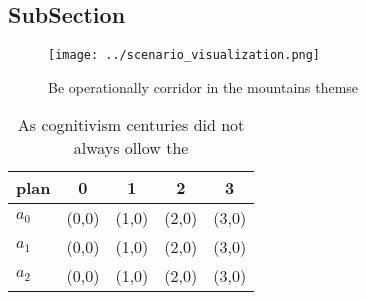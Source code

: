 \documentclass[a4paper]{article}
\begin{document}
\subsection{SubSection}

\begin{figure}
\centering
\texttt{[image: ../scenario\_visualization.png]}
\caption{Be operationally corridor in the mountains themse
}
\end{figure}
 
\begin{table}
\begin{adjustbox}{width=0.6\columnwidth}
\begin{tabular}{|l|l|l|l|l|}
\hline
\textbf{plan} & \multicolumn{1}{c|}{\textbf{0}} & \multicolumn{1}{c|}{\textbf{1}} & \multicolumn{1}{c|}{\textbf{2}} & \multicolumn{1}{c|}{\textbf{3}} \\ \hline
\textbf{$a_0$}  & (0,0) & (1,0) & (2,0) & (3,0) \\ \hline
\textbf{$a_1$}  & (0,0) & (1,0) & (2,0) & (3,0) \\ \hline
\textbf{$a_2$}  & (0,0) & (1,0) & (2,0) & (3,0) \\ \hline
\end{tabular}
\end{adjustbox}
\caption{As cognitivism centuries did not always ollow the
}
\end{table}
\end{document}
